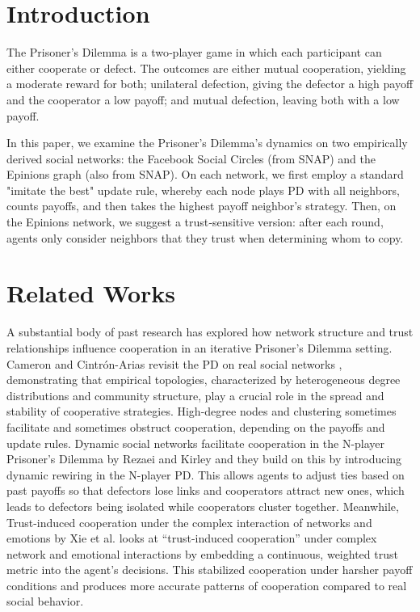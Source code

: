 \section{Introduction}
The Prisoner’s Dilemma is a two‐player game in which each participant can either cooperate or defect. The outcomes are either mutual cooperation, yielding a moderate reward for both; unilateral defection, giving the defector a high payoff and the cooperator a low payoff; and mutual defection, leaving both with a low payoff. 

In this paper, we examine the Prisoner's Dilemma’s dynamics on two empirically derived social networks: the Facebook Social Circles (from SNAP) and the Epinions graph (also from SNAP). On each network, we first employ a standard "imitate the best" update rule, whereby each node plays PD with all neighbors, counts payoffs, and then takes the highest payoff neighbor's strategy. Then, on the Epinions network, we suggest a trust‐sensitive version: after each round, agents only consider neighbors that they trust when determining whom to copy.

\section{Related Works}
A substantial body of past research has explored how network structure and trust relationships influence cooperation in an iterative Prisoner’s Dilemma setting. Cameron and Cintrón-Arias revisit the PD on real social networks \cite{CameronCintronArias2013}, demonstrating that empirical topologies, characterized by heterogeneous degree distributions and community structure, play a crucial role in the spread and stability of cooperative strategies. High-degree nodes and clustering sometimes facilitate and sometimes obstruct cooperation, depending on the payoffs and update rules. Dynamic social networks facilitate cooperation in the N-player Prisoner’s Dilemma by Rezaei and Kirley \cite{RezaeiKirley2012} and they build on this by introducing dynamic rewiring in the N-player PD. This allows agents to adjust ties based on past payoffs so that defectors lose links and cooperators attract new ones, which leads to defectors being isolated while cooperators cluster together. Meanwhile, Trust-induced cooperation under the complex interaction of networks and emotions by Xie et al. \cite{XieBaiZhangPeng2024} looks at “trust-induced cooperation” under complex network and emotional interactions by embedding a continuous, weighted trust metric into the agent’s decisions. This stabilized cooperation under harsher payoff conditions and produces more accurate patterns of cooperation compared to real social behavior.

